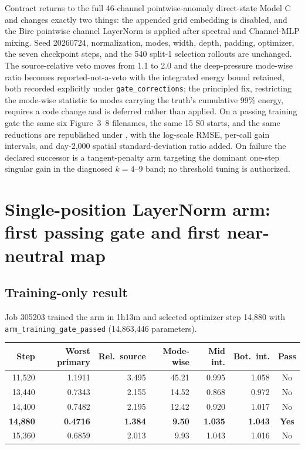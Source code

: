 \documentclass[11pt]{article}
\begin{document}
Contract  returns to
the full 46-channel pointwise-anomaly direct-state Model C and changes exactly two things:
the appended grid embedding is disabled, and the Bire pointwise channel LayerNorm is
applied after spectral and Channel-MLP mixing.  Seed 20260724, normalization, modes,
width, depth, padding, optimizer, the seven checkpoint steps, and the 540 split-1
selection rollouts are unchanged.  The source-relative veto moves from 1.1 to 2.0 and the
deep-pressure mode-wise ratio becomes reported-not-a-veto with the integrated energy bound
retained, both recorded explicitly under \texttt{gate\_corrections}; the principled fix,
restricting the mode-wise statistic to modes carrying the truth's cumulative 99\% energy,
requires a code change and is deferred rather than applied.  On a passing training gate the
same six Figure~3--8 filenames, the same 15 S0 starts, and the same reductions are
republished under
, with the log-scale
RMSE, per-call gain intervals, and day-2,000 spatial standard-deviation ratio added.  On
failure the declared successor is a tangent-penalty arm targeting the dominant one-step
singular gain in the diagnosed \(k=4\)--9 band; no threshold tuning is authorized.

\section{Single-position LayerNorm arm: first passing gate and first
near-neutral map}

\subsection{Training-only result}

Job 305203 trained the arm in 1h13m and selected optimizer step 14,880 with
\texttt{arm\_training\_gate\_passed} (14,863,446 parameters).

\begin{center}\small
\begin{tabular}{@{}rrrrrrc@{}}
\toprule
\textbf{Step} & \textbf{Worst primary} & \textbf{Rel.\ source} &
\textbf{Mode-wise} & \textbf{Mid int.} & \textbf{Bot.\ int.} & \textbf{Pass} \\
\midrule
11,520 & 1.1911 & 3.495 & 45.21 & 0.995 & 1.058 & No \\
13,440 & 0.7343 & 2.155 & 14.52 & 0.868 & 0.972 & No \\
14,400 & 0.7482 & 2.195 & 12.42 & 0.920 & 1.017 & No \\
\textbf{14,880} & \textbf{0.4716} & \textbf{1.384} & \textbf{9.50} &
\textbf{1.035} & \textbf{1.043} & \textbf{Yes} \\
15,360 & 0.6859 & 2.013 & 9.93 & 1.043 & 1.016 & No \\
\bottomrule
\end{tabular}
\end{center}
\end{document}
